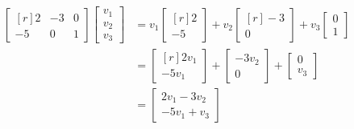 \begin{example}
\begin{align*}
\begin{bmatrix*}[r]
2 & -3 & 0 \\
-5 & 0 & 1 
\end{bmatrix*}
\begin{bmatrix}v_1\\ v_2 \\ v_3 \end{bmatrix}
&=v_1\begin{bmatrix*}[r]2\\-5 \end{bmatrix*}
+v_2\begin{bmatrix*}[r]-3 \\0\end{bmatrix*}
+v_3\begin{bmatrix}0\\1\end{bmatrix}\\
&=\begin{bmatrix*}[r]2v_1\\-5v_1\end{bmatrix*}
+\begin{bmatrix}-3v_2\\ 0\end{bmatrix} 
+\begin{bmatrix}0\\v_3\end{bmatrix}\\
&=\begin{bmatrix}2v_1-3v_2\\-5v_1+v_3\end{bmatrix}
\end{align*}
\end{example}

